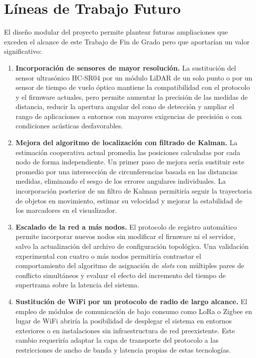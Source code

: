 \section{Líneas de Trabajo Futuro}

El diseño modular del proyecto permite plantear futuras ampliaciones que exceden el alcance de este Trabajo de Fin de Grado pero que aportarían un valor significativo:

\begin{enumerate}
    \item \textbf{Incorporación de sensores de mayor resolución.} La sustitución del sensor ultrasónico HC-SR04 por un módulo LiDAR de un solo punto o por un sensor de tiempo de vuelo óptico mantiene la compatibilidad con el protocolo y el firmware actuales, pero permite aumentar la precisión de las medidas de distancia, reducir la apertura angular del cono de detección y ampliar el rango de aplicaciones a entornos con mayores exigencias de precisión o con condiciones acústicas desfavorables.

    \item \textbf{Mejora del algoritmo de localización con filtrado de Kalman.} La estimación cooperativa actual promedia las posiciones calculadas por cada nodo de forma independiente. Un primer paso de mejora sería sustituir este promedio por una intersección de circunferencias basada en las distancias medidas, eliminando el sesgo de los errores angulares individuales. La incorporación posterior de un filtro de Kalman permitiría seguir la trayectoria de objetos en movimiento, estimar su velocidad y mejorar la estabilidad de los marcadores en el visualizador.

    \item \textbf{Escalado de la red a más nodos.} El protocolo de registro automático permite incorporar nuevos nodos sin modificar el firmware ni el servidor, salvo la actualización del archivo de configuración topológica. Una validación experimental con cuatro o más nodos permitiría contrastar el comportamiento del algoritmo de asignación de \textit{slots} con múltiples pares de conflicto simultáneos y evaluar el efecto del incremento del tiempo de supertrama sobre la latencia del sistema.

    \item \textbf{Sustitución de WiFi por un protocolo de radio de largo alcance.} El empleo de módulos de comunicación de bajo consumo como LoRa o Zigbee en lugar de WiFi abriría la posibilidad de desplegar el sistema en entornos exteriores o en instalaciones sin infraestructura de red preexistente. Este cambio requeriría adaptar la capa de transporte del protocolo a las restricciones de ancho de banda y latencia propias de estas tecnologías.


\end{enumerate}
